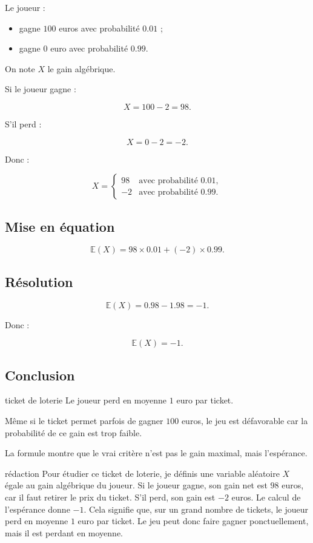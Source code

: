 \documentclass[11pt,a4paper]{article}
\newcommand{\E}{\mathbb{E}}
\begin{document}
Le joueur :
\begin{itemize}
    \item gagne $100$ euros avec probabilité $0.01$ ;
    \item gagne $0$ euro avec probabilité $0.99$.
\end{itemize}

On note $X$ le gain algébrique.

Si le joueur gagne :

\[
X=100-2=98.
\]

S'il perd :

\[
X=0-2=-2.
\]

Donc :

\[
X=
\begin{cases}
98 & \text{avec probabilité }0.01,\\
-2 & \text{avec probabilité }0.99.
\end{cases}
\]

\subsection{Mise en équation}

\[
\E(X)=98\times 0.01+(-2)\times 0.99.
\]

\subsection{Résolution}

\[
\E(X)=0.98-1.98=-1.
\]

Donc :

\[
\E(X)=-1.
\]

\subsection{Conclusion}

\begin{conclusionbox}{ticket de loterie}
Le joueur perd en moyenne $1$ euro par ticket.

Même si le ticket permet parfois de gagner $100$ euros, le jeu est défavorable car la probabilité de ce gain est trop faible.

La formule montre que le vrai critère n'est pas le gain maximal, mais l'espérance.
\end{conclusionbox}

\begin{oral}{rédaction}
Pour étudier ce ticket de loterie, je définis une variable aléatoire $X$ égale au gain algébrique du joueur. Si le joueur gagne, son gain net est $98$ euros, car il faut retirer le prix du ticket. S'il perd, son gain est $-2$ euros. Le calcul de l'espérance donne $-1$. Cela signifie que, sur un grand nombre de tickets, le joueur perd en moyenne $1$ euro par ticket. Le jeu peut donc faire gagner ponctuellement, mais il est perdant en moyenne.
\end{oral}
\end{document}
